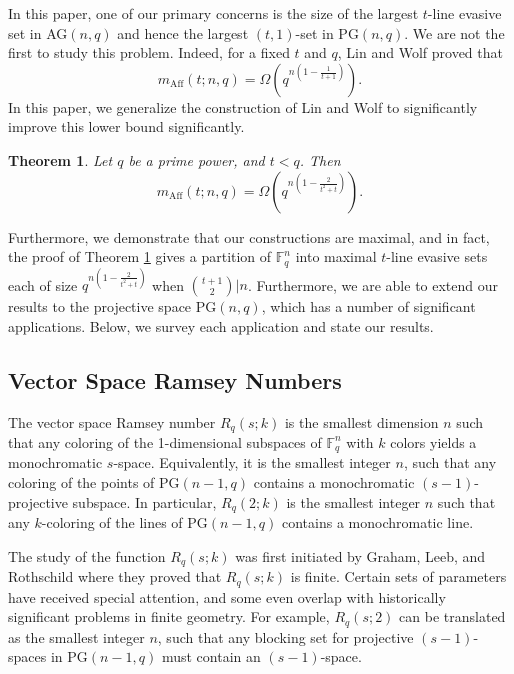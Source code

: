 \documentclass[12pt]{article}
\newtheorem{thm}{Theorem}[section]
\newcommand{\F}{\mathbb{F}}
\newcommand{\PG}{\text{PG}}
\newcommand{\mpa}[3]{m_{\text{Aff}}(#1 ; #2, #3)}
\begin{document}
In this paper, one of our primary concerns is the size of the  largest $t$-line evasive set in AG$(n, q)$ and hence the largest $(t, 1)$-set in $\PG(n, q)$. We are not the first to study this problem. Indeed, for a fixed $t$ and $q$, Lin and Wolf \cite{LW} proved that 
\begin{equation}
   \mpa{t}{n}{q}=  \Omega\left(q^{n\left(1 - \frac{1}{t+1}\right)}\right).
\end{equation}
In this paper, we generalize the construction of Lin and Wolf to significantly improve this lower bound significantly. 

\begin{thm}
\label{mainthm}
    Let $q$ be a prime power, and $t < q$. Then 
    $$
    \mpa{t}{n}{q} = \Omega\left(q^{n\left(1  - \frac{2}{t^2 + t}\right)}\right).
    $$
\end{thm}

Furthermore, we demonstrate that our constructions are maximal, and in fact, the proof of Theorem \ref{mainthm} gives a partition of $\F_q^n$ into maximal $t$-line evasive sets each of size $q^{n\left(1  - \frac{2}{t^2 + t}\right)}$ when $\binom{t+1}{2}|n$. Furthermore, we are able to extend our results to the projective space $\PG(n, q)$, which has a number of significant applications. Below, we survey each application and state our results.




\subsection{Vector Space Ramsey Numbers}

The vector space Ramsey number $R_q(s; k)$ is the smallest dimension $n$ such that any coloring of the 1-dimensional subspaces of $\F_q^n$ with $k$ colors yields a monochromatic $s$-space. Equivalently, it is the smallest integer $n$, such that any coloring of the points of $\PG(n-1, q)$ contains a monochromatic $(s-1)$-projective subspace. In particular, $R_q(2; k)$ is the smallest integer $n$ such that any $k$-coloring of the lines of $\PG(n-1, q)$ contains a monochromatic line. 

The study of the function $R_q(s; k)$ was first initiated by Graham, Leeb, and Rothschild \cite{GrahamLeebRothschild1972} where they proved that $R_q(s; k)$ is finite. Certain sets of parameters have received special attention, and some even overlap with historically significant problems in finite geometry. For example, $R_q(s; 2)$ can be translated as the smallest integer $n$, such that any blocking set for projective $(s - 1)$-spaces in $\PG(n-1, q)$ must contain an $(s-1)$-space. 
\end{document}
